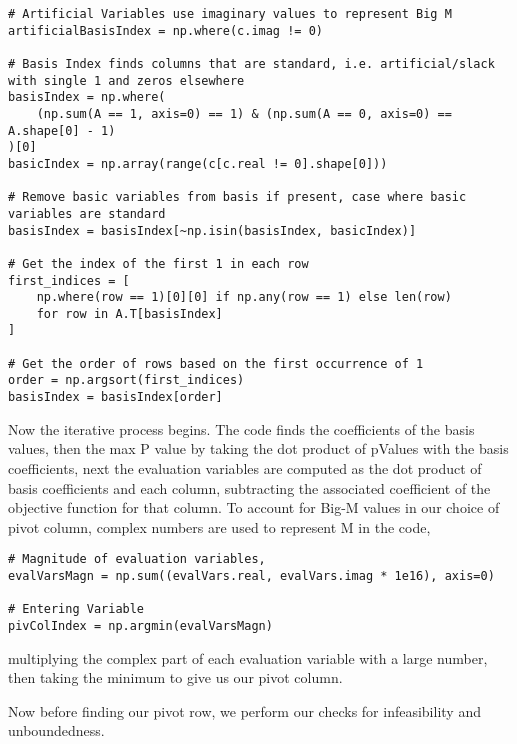 \documentclass[letterpaper, a4paper]{article}
\begin{document}
\begingroup
\fontsize{8}{10}\selectfont
\begin{verbatim}
# Artificial Variables use imaginary values to represent Big M
artificialBasisIndex = np.where(c.imag != 0)

# Basis Index finds columns that are standard, i.e. artificial/slack with single 1 and zeros elsewhere
basisIndex = np.where(
    (np.sum(A == 1, axis=0) == 1) & (np.sum(A == 0, axis=0) == A.shape[0] - 1)
)[0]
basicIndex = np.array(range(c[c.real != 0].shape[0]))

# Remove basic variables from basis if present, case where basic variables are standard
basisIndex = basisIndex[~np.isin(basisIndex, basicIndex)]

# Get the index of the first 1 in each row
first_indices = [
    np.where(row == 1)[0][0] if np.any(row == 1) else len(row)
    for row in A.T[basisIndex]
]

# Get the order of rows based on the first occurrence of 1
order = np.argsort(first_indices)
basisIndex = basisIndex[order]
\end{verbatim}
\endgroup



Now the iterative process begins. The code finds the coefficients of the basis values, then the max P value by taking the dot product of pValues with the basis coefficients, next the evaluation variables are computed as the dot product of basis coefficients and each column, subtracting the associated coefficient of the objective function for that column.
To account for Big-M values in our choice of pivot column, complex numbers are used to represent M in the code,


\begingroup
\fontsize{8}{10}\selectfont
\begin{verbatim}
# Magnitude of evaluation variables,
evalVarsMagn = np.sum((evalVars.real, evalVars.imag * 1e16), axis=0)

# Entering Variable
pivColIndex = np.argmin(evalVarsMagn)
\end{verbatim}
\endgroup
multiplying the complex part of each evaluation variable with a large number, then taking the minimum to give us our pivot column.

Now before finding our pivot row, we perform our checks for infeasibility and unboundedness.
\end{document}
